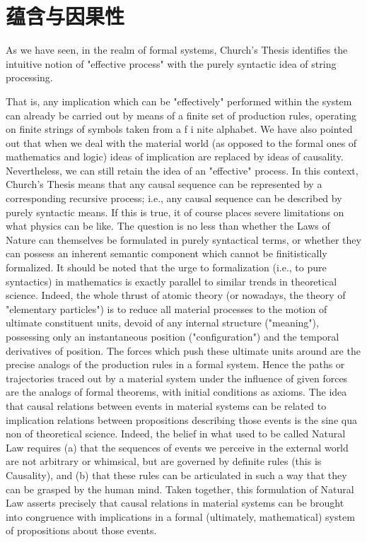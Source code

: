 \documentclass[a4paper,12pt]{article}
\begin{document}
\section{蕴含与因果性}

As we have seen, in the realm of formal systems, Church's Thesis identifies the intuitive notion of "effective process" with the purely syntactic idea of string processing.

That is, any implication which can be "effectively" performed within the system can already be carried out by means of a finite set of production rules,
operating on finite strings of symbols taken from a f i nite alphabet. We have also pointed out that when we deal with the material world
(as opposed to the formal ones of mathematics and logic) ideas of implication are replaced by ideas of causality. Nevertheless, we can still
retain the idea of an "effective" process. In this context, Church's Thesis means that any causal sequence can be represented by a corresponding
recursive process; i.e., any causal sequence can be described by purely syntactic means. If this is true, it of course places severe
limitations on what physics can be like. The question is no less than whether the Laws of Nature can themselves be formulated in purely
syntactical terms, or whether they can possess an inherent semantic component which cannot be finitistically formalized.
It should be noted that the urge to formalization (i.e., to pure syntactics) in mathematics is exactly parallel to similar trends in theoretical science.
Indeed, the whole thrust of atomic theory (or nowadays, the theory of "elementary particles") is to reduce all material processes to the motion of
ultimate constituent units, devoid of any internal structure ("meaning"), possessing only an instantaneous position ("configuration")
and the temporal derivatives of position. The forces which push these ultimate units around are the precise analogs of the production rules in a formal system.
Hence the paths or trajectories traced out by a material system under the influence of given forces are the analogs of formal theorems,
with initial conditions as axioms. The idea that causal relations between events in material systems can be related to implication relations between
propositions describing those events is the sine qua non of theoretical science. Indeed, the belief in what used to be called Natural Law requires (a)
that the sequences of events we perceive in the external world are not arbitrary or whimsical, but are governed by definite rules (this is Causality),
and (b) that these rules can be articulated in such a way that they can be grasped by the human mind. Taken together, this formulation of Natural Law
asserts precisely that causal relations in material systems can be brought into congruence with implications in a
formal (ultimately, mathematical) system of propositions about those events.
\end{document}
